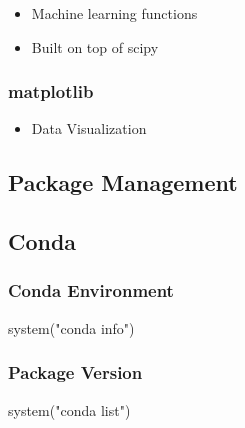 \documentclass[
]{book}
\newenvironment{Shaded}{\begin{snugshade}}{\end{snugshade}}
\newcommand{\FunctionTok}[1]{\textcolor[rgb]{0,0,0}{#1}}
\newcommand{\NormalTok}[1]{#1}
\newcommand{\StringTok}[1]{\textcolor[rgb]{0.5,0.5,0.5}{#1}}
\providecommand{\tightlist}{%
  \setlength{\itemsep}{0pt}\setlength{\parskip}{0pt}}
\begin{document}
\begin{itemize}
\tightlist
\item
  Machine learning functions\\
\item
  Built on top of scipy
\end{itemize}

\hypertarget{matplotlib}{%
\subsubsection{matplotlib}\label{matplotlib}}

\begin{itemize}
\tightlist
\item
  Data Visualization
\end{itemize}

\hypertarget{package-management}{%
\subsection{Package Management}\label{package-management}}

\hypertarget{conda}{%
\subsection{Conda}\label{conda}}

\hypertarget{conda-environment}{%
\subsubsection{Conda Environment}\label{conda-environment}}

\begin{Shaded}
\begin{Highlighting}[]
\FunctionTok{system}\NormalTok{(}\StringTok{"conda info"}\NormalTok{)}
\end{Highlighting}
\end{Shaded}

\hypertarget{package-version}{%
\subsubsection{Package Version}\label{package-version}}

\begin{Shaded}
\begin{Highlighting}[]
\FunctionTok{system}\NormalTok{(}\StringTok{"conda list"}\NormalTok{) }
\end{Highlighting}
\end{Shaded}
\end{document}
